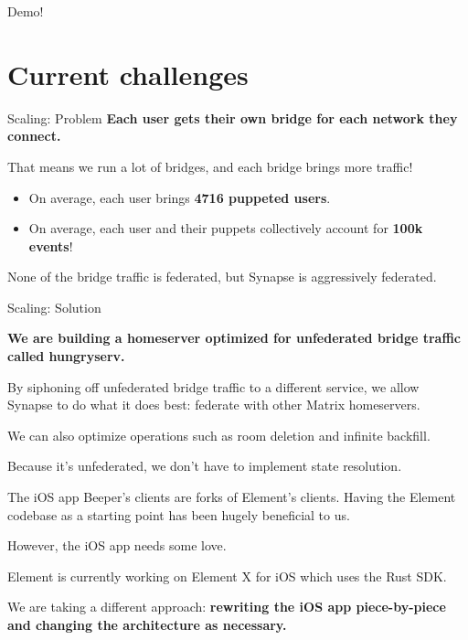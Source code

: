 \documentclass{beeper}
\begin{document}
\begingroup
\def\insertframenumber{\relax}
\begin{frame}[standout]
    \Large
    Demo!
\end{frame}
\endgroup

\section{Current challenges}

\begin{frame}{Scaling: Problem}
    \textbf{Each user gets their own bridge for each network they connect.}

    That means we run a lot of bridges, and each bridge brings more traffic!
    \pause

    \begin{itemize}
        \item On average, each user brings \textbf{4716 puppeted users}.
        \item On average, each user and their puppets collectively account for
            \textbf{100k events}!
    \end{itemize}

    \pause
    None of the bridge traffic is federated, but Synapse is aggressively
    federated.
\end{frame}

\begin{frame}{Scaling: Solution}
    \begin{center}
        \textbf{We are building a homeserver optimized for unfederated bridge
        traffic called hungryserv.}
    \end{center}
    \vspace{1cm}
    \pause

    By siphoning off unfederated bridge traffic to a different service, we allow
    Synapse to do what it does best: federate with other Matrix homeservers.
    \pause

    We can also optimize operations such as room deletion and infinite backfill.

    Because it's unfederated, we don't have to implement state resolution.
\end{frame}

\begin{frame}{The iOS app}
    Beeper's clients are forks of Element's clients. Having the Element
    codebase as a starting point has been hugely beneficial to us.
    \pause

    However, the iOS app needs some love.
    \vspace{1cm}
    \pause

    Element is currently working on Element X for iOS which uses the Rust SDK.

    We are taking a different approach: \textbf{rewriting the iOS app
    piece-by-piece and changing the architecture as necessary.}
\end{frame}
\end{document}

